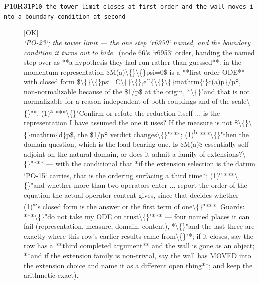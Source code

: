 \begin{description}
\item[\textbf{P10R31}\quad\texttt{P10\_the\_tower\_limit\_closes\_at\_first\_order\_and\_the\_wall\_moves\_into\_a\_boundary\_condition\_at\_second}]\hfill\textsf{[OK]}\\
\textit{`PO-23`; the tower limit --- the one step `r6950` named, and the boundary condition it turns out to hide} \ (node 66's `r6953` order, handing the named step over as **a hypothesis they had run rather than guessed**: in the momentum representation \$M(a)\textbackslash\{\}\textbackslash\{\}psi=0\$ is a **first-order ODE** with closed form \$\textbackslash\{\}\textbackslash\{\}psi=C\textbackslash\{\}\textbackslash\{\},e\textasciicircum{}\{\textbackslash\{\}\textbackslash\{\}mathrm\{i\}c(a)p\}/p\$, non-normalizable because of the \$1/p\$ at the origin, *\textbackslash\{\}"and that is not normalizable for a reason independent of both couplings and of the scale\textbackslash\{\}"*. (1)\textsuperscript{a} ***\textbackslash\{\}"Confirm or refute the reduction itself ... is the representation I have assumed the one it uses? If the measure is not \$\textbackslash\{\}\textbackslash\{\}mathrm\{d\}p\$, the \$1/p\$ verdict changes\textbackslash\{\}"***; (1)\textsuperscript{b} ***\textbackslash\{\}"then the domain question, which is the load-bearing one. Is \$M(a)\$ essentially self-adjoint on the natural domain, or does it admit a family of extensions?\textbackslash\{\}"*** --- with the conditional that *if the extension selection is the datum `PO-15` carries, that is the ordering surfacing a third time*; (1)\textsuperscript{c} ***\textbackslash\{\}"and whether more than two operators enter ... report the order of the equation the actual operator content gives, since that decides whether (1)\textsuperscript{a}'s closed form is the answer or the first term of one\textbackslash\{\}"***.  Guards: ***\textbackslash\{\}"do not take my ODE on trust\textbackslash\{\}"*** --- four named places it can fail (representation, measure, domain, content), *\textbackslash\{\}"and the last three are exactly where this row's earlier results came from\textbackslash\{\}"*; if it closes, say the row has a **third completed argument** and the wall is gone as an object; **and if the extension family is non-trivial, say the wall has MOVED into the extension choice and name it as a different open thing**; and keep the arithmetic exact). 

\end{description}
